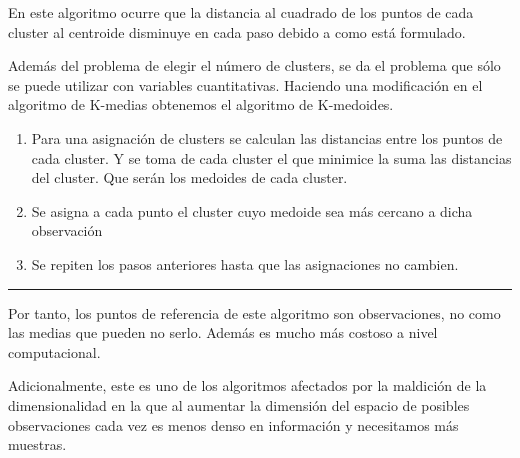 \noindent En este algoritmo ocurre que la distancia al cuadrado de los puntos de cada cluster al centroide disminuye en cada paso debido a como está formulado. 

\noindent Además del problema de elegir el número de clusters, se da el problema que sólo se puede utilizar con variables cuantitativas. Haciendo una modificación en el algoritmo de K-medias obtenemos el algoritmo de K-medoides. \\


\begin{enumerate}
\hrule

\item Para una asignación de clusters se calculan las distancias entre los puntos de cada cluster. Y se toma de cada cluster el que minimice la suma las distancias del cluster. Que serán los medoides de cada cluster. 
\item Se asigna a cada punto el cluster cuyo medoide sea más cercano a dicha observación 
\item Se repiten los pasos anteriores hasta que las asignaciones no cambien. 

\end{enumerate}
\hrule
 
\noindent Por tanto, los puntos de referencia de este algoritmo son observaciones, no como las medias que pueden no serlo. Además es mucho más costoso a nivel computacional. 

\noindent Adicionalmente, este es uno de los algoritmos afectados por la maldición de la dimensionalidad en la que al aumentar la dimensión del espacio de posibles observaciones cada vez es menos denso en información y necesitamos más muestras. 

















